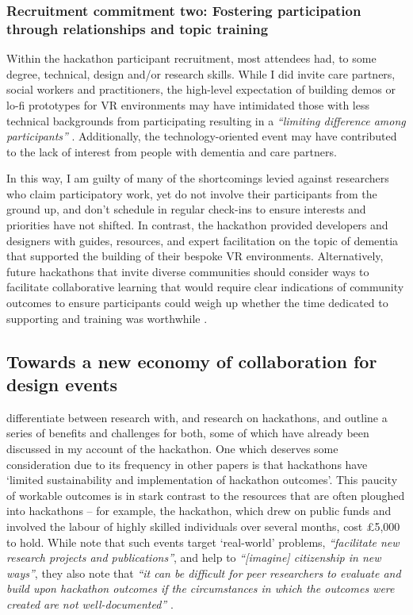\subsubsection{Recruitment commitment two: Fostering participation through relationships and topic training}
\label{DiscussionTwo:CommitTwo}
Within the hackathon participant recruitment, most attendees had, to some degree, technical, design and/or research skills. While I did invite care partners, social workers and practitioners, the high-level expectation of building demos or lo-fi prototypes for VR environments may have intimidated those with less technical backgrounds from participating resulting in a \textit{``limiting difference among participants''} \citep{irani_hackathons_2015}. Additionally, the technology-oriented event may have contributed to the lack of interest from people with dementia and care partners. 

In this way, I am guilty of many of the shortcomings levied against researchers who claim participatory work, yet do not involve their participants from the ground up, and don’t schedule in regular check-ins to ensure interests and priorities have not shifted. In contrast, the hackathon provided developers and designers with guides, resources, and expert facilitation on the topic of dementia that supported the building of their bespoke VR environments. Alternatively, future hackathons that invite diverse communities should consider ways to facilitate collaborative learning that would require clear indications of community outcomes to ensure participants could weigh up whether the time dedicated to supporting and training was worthwhile \citep{hayes2020inclusive}.

\subsection{Towards a new economy of collaboration for design events}
\label{DiscussionThree}
\cite{falk_olesen_10_2020} differentiate between research with, and research on hackathons, and outline a series of benefits and challenges for both, some of which have already been discussed in my account of the hackathon. One which deserves some consideration due to its frequency in other papers \citep{hope_hackathons_2019,johnson_civic_2014} is that hackathons have ‘limited sustainability and implementation of hackathon outcomes’. This paucity of workable outcomes is in stark contrast to the resources that are often ploughed into hackathons – for example, the hackathon, which drew on public funds and involved the labour of highly skilled individuals over several months, cost £5,000 to hold. While \cite{falk_olesen_10_2020} note that such events target `real-world' problems, \textit{``facilitate new research projects and publications''}, and help to \textit{``[imagine] citizenship in new ways''}, they also note that \textit{``it can be difficult for peer researchers to evaluate and build upon hackathon outcomes if the circumstances in which the outcomes were created are not well-documented''} \citep{falk_olesen_10_2020}.

